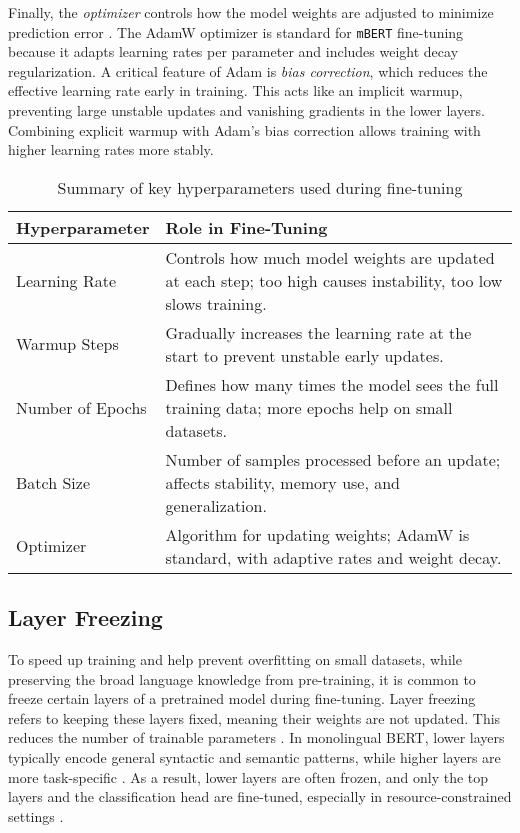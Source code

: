     Finally, the \textit{optimizer} controls how the model weights are adjusted to minimize prediction error \parencite{mosbachStabilityFinetuningBERT2021}. The AdamW optimizer is standard for \texttt{mBERT} fine-tuning because it adapts learning rates per parameter and includes weight decay regularization. A critical feature of Adam is \textit{bias correction}, which reduces the effective learning rate early in training. This acts like an implicit warmup, preventing large unstable updates and vanishing gradients in the lower layers. Combining explicit warmup with Adam’s bias correction allows training with higher learning rates more stably.

    \vspace{0.6em}
    \begin{table}[h]
        \centering
        \begin{tabularx}{\textwidth}{l X}
        \toprule
        \textbf{Hyperparameter} & \textbf{Role in Fine-Tuning} \\
        \midrule
        Learning Rate & Controls how much model weights are updated at each step; too high causes instability, too low slows training. \\
        Warmup Steps & Gradually increases the learning rate at the start to prevent unstable early updates. \\
        Number of Epochs & Defines how many times the model sees the full training data; more epochs help on small datasets. \\
        Batch Size & Number of samples processed before an update; affects stability, memory use, and generalization. \\
        Optimizer & Algorithm for updating weights; AdamW is standard, with adaptive rates and weight decay. \\
        \bottomrule
        \end{tabularx}
        \caption{Summary of key hyperparameters used during fine-tuning}
    \end{table}


\subsection{Layer Freezing} \label{subsection:layer_freezing}
    To speed up training and help prevent overfitting on small datasets, while preserving the broad language knowledge from pre-training, it is common to freeze certain layers of a pretrained model during fine-tuning. Layer freezing refers to keeping these layers fixed, meaning their weights are not updated. This reduces the number of trainable parameters \parencite{sorrentiSelectiveFreezingEfficient2023}. In monolingual BERT, lower layers typically encode general syntactic and semantic patterns, while higher layers are more task-specific \parencite{nadipalliLayerWiseEvolutionRepresentations2025}. As a result, lower layers are often frozen, and only the top layers and the classification head are fine-tuned, especially in resource-constrained settings \parencite{nadipalliLayerWiseEvolutionRepresentations2025}.


